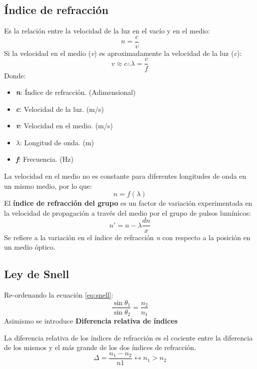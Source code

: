 \documentclass[
	12pt, %
	fleqn, %
	a4paper, %
	oneside, %
]{LegrandOrangeBook}
\begin{document}
\subsection{Índice de refracción}
\begin{definition}
Es la relación entre la velocidad de la luz en el vacío y en el medio:
\begin{equation}
n=\frac{c}{v}
\end{equation}
Si la velocidad en el medio (\textit{v}) es aproximadamente la velocidad de la luz (\textit{c}):
\begin{equation}
v\approx c \therefore \lambda=\frac{c}{f}
\end{equation}
Donde:
\begin{itemize}
\item \textbf{\textit{n}}: Índice de refracción. (Adimensional)
\item \textbf{\textit{c}}: Velocidad de la luz. (m/s)
\item \textbf{\textit{v}}: Velocidad en el medio. (m/s)
\item $\lambda$: Longitud de onda. (m)
\item \textbf{\textit{f}}: Frecuencia. (Hz)
\end{itemize}
\end{definition}
La velocidad en el medio no es constante para diferentes longitudes de onda en un mismo medio, por lo que:
\begin{displaymath}
n=f(\lambda)
\end{displaymath}
El \textbf{índice de refracción del grupo} es un factor de variación experimentada en la velocidad de propagación a través del medio por el grupo de pulsos lumínicos:
\begin{equation}
n'=n-\lambda\frac{dn}{x}
\end{equation}
Se refiere a la variación en el índice de refracción \textit{n} con respecto a la posición en un medio óptico.
\subsection{Ley de Snell}
Re-ordenando la ecuación \ref{eq:snell}:
\begin{equation}
\frac{\sin\theta_1}{\sin\theta_2}=\frac{n_2}{n_1}
\end{equation}
Asimismo se introduce \textbf{Diferencia relativa de índices}
\begin{definition}
La diferencia relativa de los índices de refracción es el cociente entre la diferencia de los mismos y el más grande de los dos índices de refracción.
\begin{equation}
\Delta=\frac{n_1-n_2}{n1}\leftrightarrow n_1>n_2
\label{eq:dif rela ind}
\end{equation}
\end{definition}
\end{document}

